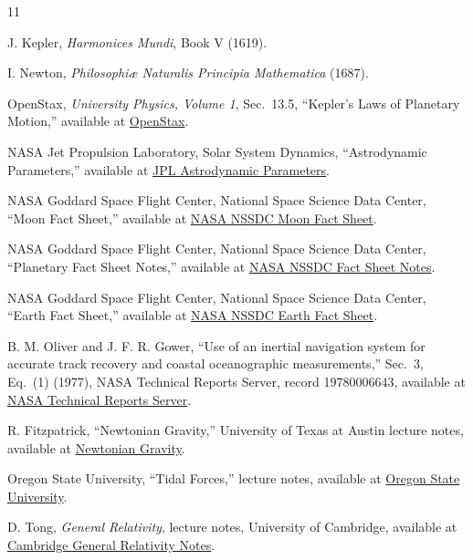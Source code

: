 \documentclass[12pt]{article}
\begin{document}
\begin{thebibliography}{11}
\small
{}
\raggedright
{}

J. Kepler,
\emph{Harmonices Mundi}, Book V (1619).

I. Newton,
\emph{Philosophi\ae{} Naturalis Principia Mathematica} (1687).

OpenStax,
\emph{University Physics, Volume 1}, Sec.~13.5, ``Kepler's Laws of Planetary Motion,''
available at \href{https://openstax.org/books/university-physics-volume-1/pages/13-5-keplers-laws-of-planetary-motion}{OpenStax}.

NASA Jet Propulsion Laboratory,
Solar System Dynamics, ``Astrodynamic Parameters,''
available at \href{https://ssd.jpl.nasa.gov/astro_par.html}{JPL Astrodynamic Parameters}.

NASA Goddard Space Flight Center,
National Space Science Data Center, ``Moon Fact Sheet,''
available at \href{https://nssdc.gsfc.nasa.gov/planetary/factsheet/moonfact.html}{NASA NSSDC Moon Fact Sheet}.

NASA Goddard Space Flight Center,
National Space Science Data Center, ``Planetary Fact Sheet Notes,''
available at \href{https://nssdc.gsfc.nasa.gov/planetary/factsheet/planetfact_notes.html}{NASA NSSDC Fact Sheet Notes}.

NASA Goddard Space Flight Center,
National Space Science Data Center, ``Earth Fact Sheet,''
available at \href{https://nssdc.gsfc.nasa.gov/planetary/factsheet/earthfact.html}{NASA NSSDC Earth Fact Sheet}.

B. M. Oliver and J. F. R. Gower,
``Use of an inertial navigation system for accurate track recovery and coastal oceanographic measurements,''
Sec.~3, Eq.~(1) (1977), NASA Technical Reports Server, record 19780006643,
available at \href{https://ntrs.nasa.gov/citations/19780006643}{NASA Technical Reports Server}.

R. Fitzpatrick,
``Newtonian Gravity,''
University of Texas at Austin lecture notes,
available at \href{https://farside.ph.utexas.edu/teaching/celestial/Celestialhtml/node14.html}{Newtonian Gravity}.

Oregon State University,
``Tidal Forces,'' lecture notes,
available at \href{https://sites.science.oregonstate.edu/physics/coursewikis/GGR/book/ggr/tidal.html}{Oregon State University}.

D. Tong,
\emph{General Relativity},
lecture notes, University of Cambridge,
available at \href{https://www.damtp.cam.ac.uk/user/tong/gr/grhtml/}{Cambridge General Relativity Notes}.

\end{thebibliography}
\end{document}
